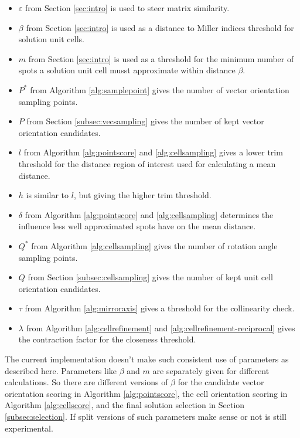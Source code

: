\documentclass[a4paper,10pt]{article}
\begin{document}
\begin{itemize}
 \item $\varepsilon$ from Section \ref{sec:intro} is used to steer matrix similarity.
 \item $\beta$ from Section \ref{sec:intro} is used as a distance to Miller indices threshold for solution unit cells.
 \item $m$ from Section \ref{sec:intro} is used as a threshold for the minimum number of spots a solution unit cell musst approximate within distance $\beta$.
 \item $P^*$ from Algorithm \ref{alg:samplepoint} gives the number of vector orientation sampling points.
 \item $P$ from Section \ref{subsec:vecsampling} gives the number of kept vector orientation candidates.
 \item $l$ from Algorithm \ref{alg:pointscore} and \ref{alg:cellsampling} gives a lower trim threshold for the distance region of interest used for calculating a mean distance.
 \item $h$ is similar to $l$, but giving the higher trim threshold.
 \item $\delta$ from Algorithm \ref{alg:pointscore} and \ref{alg:cellsampling} determines the influence less well approximated spots have on the mean distance.
 \item $Q^*$ from Algorithm \ref{alg:cellsampling} gives the number of rotation angle sampling points.
 \item $Q$ from Section \ref{subsec:cellsampling} gives the number of kept unit cell orientation candidates.
 \item $\tau$ from Algorithm \ref{alg:mirroraxis} gives a threshold for the collinearity check.
 \item $\lambda$ from Algorithm \ref{alg:cellrefinement} and \ref{alg:cellrefinement-reciprocal} gives the contraction factor for the closeness threshold.
\end{itemize}

The current implementation doesn't make such consistent use of parameters as described here. Parameters like $\beta$ and $m$ are separately given for different calculations. So there are different versions of $\beta$ for the candidate vector orientation scoring in Algorithm \ref{alg:pointscore}, the cell orientation scoring in Algorithm \ref{alg:cellscore}, and the final solution selection in Section \ref{subsec:selection}. If split versions of such parameters make sense or not is still experimental.

\printbibliography
\end{document}
